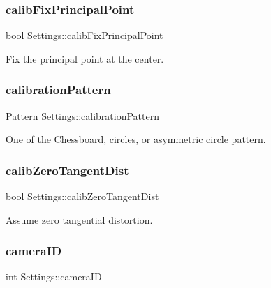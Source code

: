 \subsubsection{\texorpdfstring{calib\+Fix\+Principal\+Point}{calibFixPrincipalPoint}}
{\footnotesize\ttfamily bool Settings\+::calib\+Fix\+Principal\+Point}



Fix the principal point at the center. 

\mbox{\label{class_settings_a94551b7ffe8ac60311b035b2905e9498}} 
\subsubsection{\texorpdfstring{calibration\+Pattern}{calibrationPattern}}
{\footnotesize\ttfamily \mbox{\hyperlink{class_settings_a0e7117abd9427a6f8bc1d1d8d456b5c8}{Pattern}} Settings\+::calibration\+Pattern}



One of the Chessboard, circles, or asymmetric circle pattern. 

\mbox{\label{class_settings_a4bc7ff147d74721a3587ce6fcb64ef32}} 
\subsubsection{\texorpdfstring{calib\+Zero\+Tangent\+Dist}{calibZeroTangentDist}}
{\footnotesize\ttfamily bool Settings\+::calib\+Zero\+Tangent\+Dist}



Assume zero tangential distortion. 

\mbox{\label{class_settings_af32a5ff06192bde106c934e0361bcd7e}} 
\subsubsection{\texorpdfstring{camera\+ID}{cameraID}}
{\footnotesize\ttfamily int Settings\+::camera\+ID}

